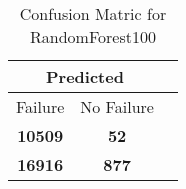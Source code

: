 \begin{table}[] 
\caption{Confusion Matric for RandomForest100} 
\label{Table: Prediction Accuracy-NoneRandomForest10090.0EKF-ignoresolarPanelDipole-solarPanelDipole} 
\centering 
\begin{tabular} 
 {@{}ccc@{}} 
\toprule 
\multicolumn{2}{c}{\textbf{Predicted}}
 \\ \midrule 
\multicolumn{1}{|c|}{Failure} & 
\multicolumn{1}{c|}{No Failure}
 \\ \midrule 
\multicolumn{1}{|c|}{\color{red}\textbf{10509}} & 
\multicolumn{1}{c|}{\color{red}\textbf{52}}
 \\ \midrule 
\multicolumn{1}{|c|}{\color{green}\textbf{16916}} & 
\multicolumn{1}{c|}{\color{green}\textbf{877}}
 \\ \bottomrule 
\end{tabular} 
\end{table} 
